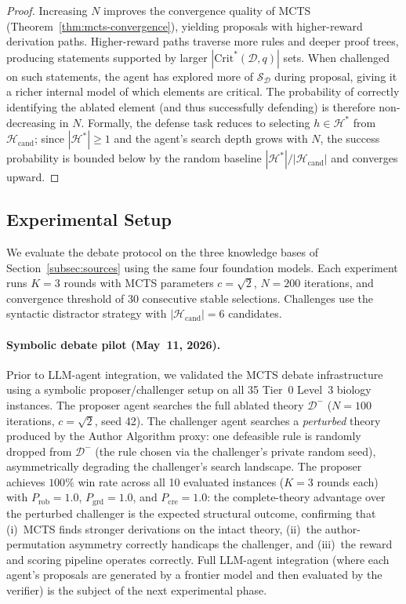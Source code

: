 \documentclass{article}
\theoremstyle{definition}
\newcommand{\D}{\mathcal{D}}
\newcommand{\Dm}{\mathcal{D}^{-}}
\newcommand{\Hcand}{\mathcal{H}_{\mathrm{cand}}}
\newcommand{\Hgold}{\mathcal{H}^{*}}
\newcommand{\CritStar}{\mathrm{Crit}^{*}}
\newcommand{\SD}{\mathcal{S}_{\D}}
\begin{document}
\begin{proof}
Increasing $N$ improves the convergence quality of MCTS (Theorem~\ref{thm:mcts-convergence}), yielding proposals with higher-reward derivation paths. Higher-reward paths traverse more rules and deeper proof trees, producing statements supported by larger $|\CritStar(\D, q)|$ sets. When challenged on such statements, the agent has explored more of $\SD$ during proposal, giving it a richer internal model of which elements are critical. The probability of correctly identifying the ablated element (and thus successfully defending) is therefore non-decreasing in $N$. Formally, the defense task reduces to selecting $h \in \Hgold$ from $\Hcand$; since $|\Hgold| \geq 1$ and the agent's search depth grows with $N$, the success probability is bounded below by the random baseline $|\Hgold|/|\Hcand|$ and converges upward.
\end{proof}

\subsection{Experimental Setup}\label{subsec:debate-setup}

We evaluate the debate protocol on the three knowledge bases of Section~\ref{subsec:sources} using the same four foundation models. Each experiment runs $K = 3$ rounds with MCTS parameters $c = \sqrt{2}$, $N = 200$ iterations, and convergence threshold of 30 consecutive stable selections. Challenges use the syntactic distractor strategy with $|\Hcand| = 6$ candidates.

\paragraph{Symbolic debate pilot (May~11, 2026).} Prior to LLM-agent integration, we validated the MCTS debate infrastructure using a symbolic proposer/challenger setup on all 35 Tier~0 Level~3 biology instances. The proposer agent searches the full ablated theory $\Dm$ ($N=100$ iterations, $c=\sqrt{2}$, seed 42). The challenger agent searches a \emph{perturbed} theory produced by the Author Algorithm proxy: one defeasible rule is randomly dropped from $\Dm$ (the rule chosen via the challenger's private random seed), asymmetrically degrading the challenger's search landscape. The proposer achieves $100\%$ win rate across all 10 evaluated instances ($K=3$ rounds each) with $P_{\mathrm{rob}} = 1.0$, $P_{\mathrm{grd}} = 1.0$, and $P_{\mathrm{cre}} = 1.0$: the complete-theory advantage over the perturbed challenger is the expected structural outcome, confirming that (i)~MCTS finds stronger derivations on the intact theory, (ii)~the author-permutation asymmetry correctly handicaps the challenger, and (iii)~the reward and scoring pipeline operates correctly. Full LLM-agent integration (where each agent's proposals are generated by a frontier model and then evaluated by the verifier) is the subject of the next experimental phase.
\end{document}
